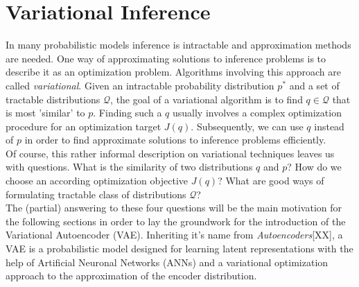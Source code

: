 \documentclass[12pt]{report}
\theoremstyle{definition}
\begin{document}
\section{Variational Inference}
In many probabilistic models inference is intractable and approximation methods are needed. One way of approximating solutions to inference problems is to describe it as an optimization problem. Algorithms involving this approach are called \emph{variational}.
Given an intractable probability distribution $p^*$ and a set of tractable distributions $\mathcal{Q}$, the goal of a variational algorithm is to find $q \in \mathcal{Q}$ that is most 'similar' to $p$. Finding such a $q$ usually involves a complex optimization procedure for an optimization target $J(q)$. Subsequently, we can use $q$ instead of $p$ in order to find approximate solutions to inference problems efficiently.\\
Of course, this rather informal description on variational techniques leaves us with questions. What is the similarity of two distributions $q$ and $p$? How do we choose an according optimization objective $J(q)$? What are good ways of formulating tractable class of distributions $\mathcal{Q}$? \\
The (partial) answering to these four questions will be the main motivation for the following sections in order to lay the groundwork for the introduction of the Variational Autoencoder (VAE). Inheriting it's name from \emph{Autoencoders}[XX], a VAE is a probabilistic model designed for learning latent representations with the help of Artificial Neuronal Networks (ANNs) and a variational optimization approach to the approximation of the encoder distribution.
\end{document}
